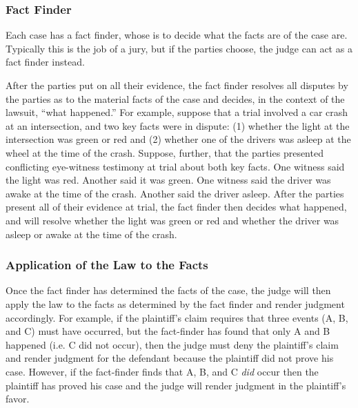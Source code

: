 \subsubsection{Fact Finder}
Each case has a fact finder, whose is to decide what the facts are of the case are.  Typically this is the job of a jury, but if the parties choose, the judge can act as a fact finder instead.

After the parties put on all their evidence, the fact finder resolves all disputes by the parties as to the material facts of the case and decides, in the context of the lawsuit, ``what happened.''  For example, suppose that a trial involved a car crash at an intersection, and two key facts were in dispute: (1) whether the light at the intersection was green or red and (2) whether one of the drivers was asleep at the wheel at the time of the crash.  Suppose, further, that the parties presented conflicting eye-witness testimony at trial about both key facts.  One witness said the light was red.  Another said it was green.  One witness said the driver was awake at the time of the crash.  Another said the driver asleep.  
After the parties present all of their evidence at trial, the fact finder then decides what happened, and will resolve whether the light was green or red and whether the driver was asleep or awake at the time of the crash.


\subsubsection{Application of the Law to the Facts}
Once the fact finder has determined the facts of the case, the judge will then apply the law to the facts as determined by the fact finder and render judgment accordingly.
For example, if the plaintiff's claim requires that three events (A, B, and C) must have occurred, but the fact-finder has found that only A and B happened (i.e. C did not occur), then the judge must deny the plaintiff's claim and render judgment for the defendant because the plaintiff did not prove his case.  However, if the fact-finder finds that A, B, and C \textit{did} occur then the plaintiff has proved his case and the judge will render judgment in the plaintiff's favor.

